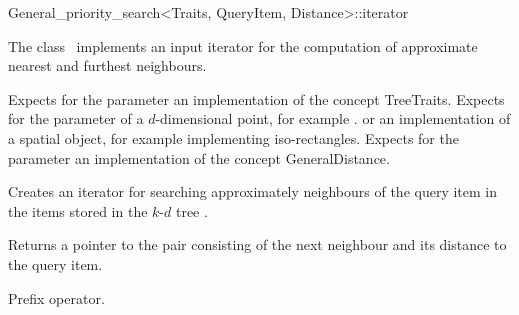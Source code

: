 

\begin{ccRefClass}{General_priority_search<Traits, QueryItem, Distance>::iterator}  %


\ccDefinition

The class \ccRefName\ implements an input iterator
for the computation of approximate nearest and furthest neighbours.


\ccParameters

Expects for the parameter  an implementation of the concept TreeTraits.
Expects for the parameter   of a $d$-dimensional point, for example .
or an implementation of a spatial object, for
example  implementing iso-rectangles.
Expects for the parameter  an implementation of the
concept GeneralDistance.

\ccCreation
{}  %

{Creates an iterator for searching approximately neighbours of the query item 
in the items stored in the $k$-$d$ tree .}


{Returns a pointer to the pair consisting of the next neighbour and its distance
to the query item.}

{Prefix operator.}


\end{ccRefClass}
